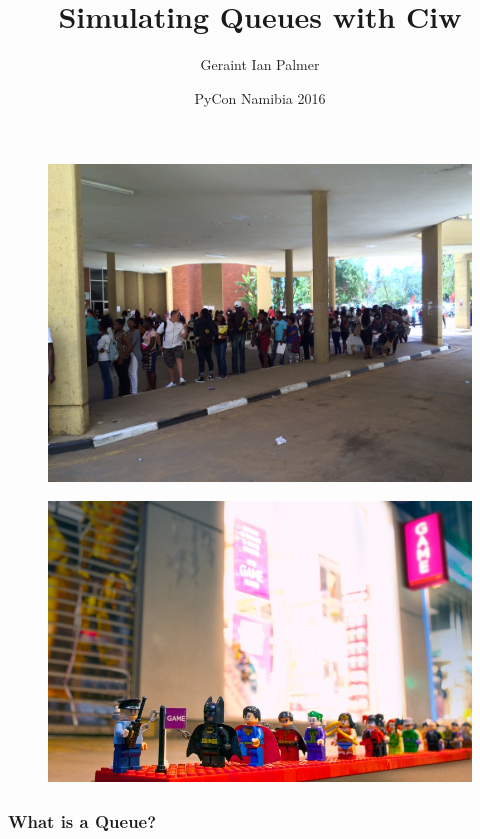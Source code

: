 \documentclass{beamer}
\title
{Simulating Queues with Ciw}
\author{Geraint Ian Palmer}
\date{PyCon Namibia 2016}
\begin{document}
\frame{\titlepage}


\begin{frame}
\begin{figure}
    \includegraphics[width=\textwidth]{UNAMqueue}
\end{figure}
\end{frame}

\begin{frame}
\begin{figure}
    \includegraphics[width=\textwidth]{legoqueue}
\end{figure}
\end{frame}

\begin{frame}
\frametitle{What is a Queue?}
\begin{figure}
  
\end{figure}
\end{frame}
\end{document}
